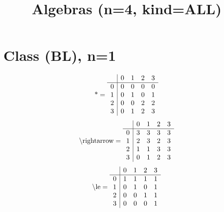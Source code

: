 \documentclass[11pt]{article}
\title{Algebras (n=4, kind=ALL)}
\date{}
\begin{document}
\maketitle
\tableofcontents
\section{Class (BL), n=1}
\[\text{*} = 
\begin{array}{r | r r r r}
 & 0 & 1 & 2 & 3 \\ \hline
0 & 0 & 0 & 0 & 0 \\
1 & 0 & 1 & 0 & 1 \\
2 & 0 & 0 & 2 & 2 \\
3 & 0 & 1 & 2 & 3 \\
\end{array}
\]
\[\text{\textbackslash rightarrow} = 
\begin{array}{r | r r r r}
 & 0 & 1 & 2 & 3 \\ \hline
0 & 3 & 3 & 3 & 3 \\
1 & 2 & 3 & 2 & 3 \\
2 & 1 & 1 & 3 & 3 \\
3 & 0 & 1 & 2 & 3 \\
\end{array}
\]
\[\text{\textbackslash le} = 
\begin{array}{r | r r r r}
 & 0 & 1 & 2 & 3 \\ \hline
0 & 1 & 1 & 1 & 1 \\
1 & 0 & 1 & 0 & 1 \\
2 & 0 & 0 & 1 & 1 \\
3 & 0 & 0 & 0 & 1 \\
\end{array}
\]
\end{document}
